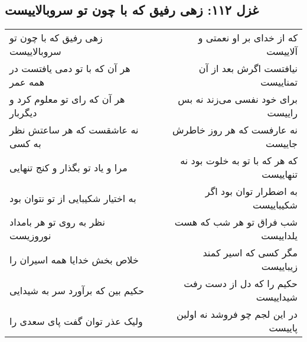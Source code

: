 \begin{center}
\section*{غزل ۱۱۲: زهی رفیق که با چون تو سروبالاییست}
\label{sec:112}
\begin{longtable}{l p{0.5cm} r}
زهی رفیق که با چون تو سروبالاییست
&&
که از خدای بر او نعمتی و آلاییست
\\
هر آن که با تو دمی یافتست در همه عمر
&&
نیافتست اگرش بعد از آن تمناییست
\\
هر آن که رای تو معلوم کرد و دیگربار
&&
برای خود نفسی می‌زند نه بس راییست
\\
نه عاشقست که هر ساعتش نظر به کسی
&&
نه عارفست که هر روز خاطرش جاییست
\\
مرا و یاد تو بگذار و کنج تنهایی
&&
که هر که با تو به خلوت بود نه تنهاییست
\\
به اختیار شکیبایی از تو نتوان بود
&&
به اضطرار توان بود اگر شکیباییست
\\
نظر به روی تو هر بامداد نوروزیست
&&
شب فراق تو هر شب که هست یلداییست
\\
خلاص بخش خدایا همه اسیران را
&&
مگر کسی که اسیر کمند زیباییست
\\
حکیم بین که برآورد سر به شیدایی
&&
حکیم را که دل از دست رفت شیداییست
\\
ولیک عذر توان گفت پای سعدی را
&&
در این لجم چو فروشد نه اولین پاییست
\\
\end{longtable}
\end{center}
